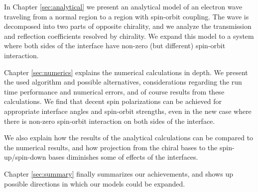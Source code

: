 In Chapter \ref{sec:analytical} we present an analytical model of an electron
wave traveling from a normal region to a region with spin-orbit coupling. The
wave is decomposed into two parts of opposite chirality, and we 
analyze the transmission and reflection coefficients resolved by chirality.
We expand this model to a system where both sides of the interface have
non-zero (but different) spin-orbit interaction.

Chapter \ref{sec:numerics} explains the numerical calculations in depth. We
present the used algorithm and possible alternatives, considerations regarding
the run time performance and numerical errors, and of course results from
these calculations. We find that decent spin polarizations can be achieved
for appropriate interface angles and spin-orbit strengths, even in the new
case where there is non-zero spin-orbit interaction on both sides of
the interface.

We also explain how the results of the analytical calculations can be compared
to the numerical results, and how projection from the chiral bases to the
spin-up/spin-down bases diminishes some of effects of the interfaces.

Chapter \ref{sec:summary} finally summarizes our achievements, and shows up
possible directions in which our models could be expanded.

